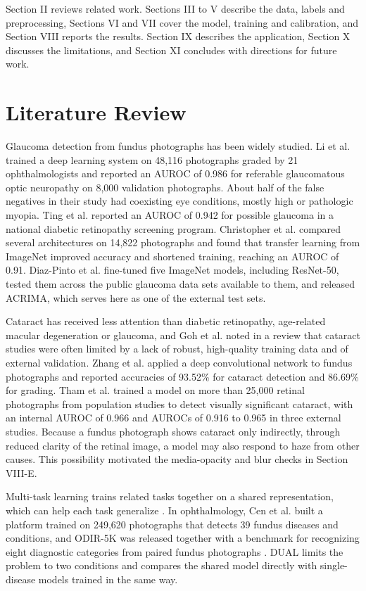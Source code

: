 \documentclass[conference,a4paper]{IEEEtran}
\begin{document}
Section II reviews related work. Sections III to V describe the data, labels and preprocessing,
Sections VI and VII cover the model, training and calibration, and Section VIII reports the results.
Section IX describes the application, Section X discusses the limitations, and Section XI concludes
with directions for future work.

\section{Literature Review}

Glaucoma detection from fundus photographs has been widely studied. Li et al. \cite{ref6} trained a
deep learning system on 48,116 photographs graded by 21 ophthalmologists and reported an AUROC of
0.986 for referable glaucomatous optic neuropathy on 8,000 validation photographs. About half of the
false negatives in their study had coexisting eye conditions, mostly high or pathologic myopia. Ting
et al. \cite{ref5} reported an AUROC of 0.942 for possible glaucoma in a national diabetic
retinopathy screening program. Christopher et al. \cite{ref11} compared several architectures on
14,822 photographs and found that transfer learning from ImageNet improved accuracy and shortened
training, reaching an AUROC of 0.91. Diaz-Pinto et al. \cite{ref12} fine-tuned five ImageNet models,
including ResNet-50, tested them across the public glaucoma data sets available to them, and
released ACRIMA, which serves here as one of the external test sets.

Cataract has received less attention than diabetic retinopathy, age-related macular degeneration or
glaucoma, and Goh et al. \cite{ref8} noted in a review that cataract studies were often limited by a
lack of robust, high-quality training data and of external validation. Zhang et al. \cite{ref13}
applied a deep convolutional network to fundus photographs and reported accuracies of 93.52\% for
cataract detection and 86.69\% for grading. Tham et al. \cite{ref2} trained a model on more than
25,000 retinal photographs from population studies to detect visually significant cataract, with an
internal AUROC of 0.966 and AUROCs of 0.916 to 0.965 in three external studies. Because a fundus
photograph shows cataract only indirectly, through reduced clarity of the retinal image, a model may
also respond to haze from other causes. This possibility motivated the media-opacity and blur checks
in Section VIII-E.

Multi-task learning trains related tasks together on a shared representation, which can help each
task generalize \cite{ref14}. In ophthalmology, Cen et al. \cite{ref15} built a platform trained on
249,620 photographs that detects 39 fundus diseases and conditions, and ODIR-5K was released
together with a benchmark for recognizing eight diagnostic categories from paired fundus photographs
\cite{ref16}. DUAL limits the problem to two conditions and compares the shared model directly with
single-disease models trained in the same way.
\end{document}
